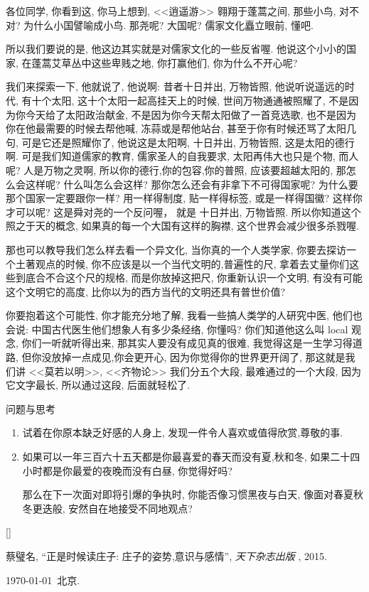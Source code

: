 \documentclass[11pt]{article}
\def\beginrefs{\begin{list}%
		{[\arabic{equation}]}{\usecounter{equation}
			\setlength{\leftmargin}{0.8truecm}\setlength{\labelsep}{0.4truecm}%
			\setlength{\labelwidth}{1.6truecm}}}
\def\endrefs{\end{list}}
\def\bibentry#1{\item[\hbox{[#1]}]}
\begin{document}
各位同学, 你看到这, 你马上想到, <<逍遥游>> 翱翔于蓬蒿之间, 那些小鸟, 对不对? 为什么小国譬喻成小鸟. 那尧呢? 大国呢? 儒家文化矗立眼前, 懂吧. 

所以我们要说的是, 他这边其实就是对儒家文化的一些反省喔. 他说这个小小的国家, 在蓬蒿艾草丛中这些卑贱之地, 你打赢他们, 你为什么不开心呢? 

我们来探索一下, 他就说了, 他说啊: {\color{blue} 昔者十日并出, 万物皆照}, 他说听说遥远的时代, 有十个太阳, 这十个太阳一起高挂天上的时候, 世间万物通通被照耀了, 不是因为你今天给了太阳政治献金, 不是因为你今天帮太阳做了一首竞选歌, 也不是因为你在他最需要的时候去帮他喊, 冻蒜或是帮他站台, 甚至于你有时候还骂了太阳几句, 可是它还是照耀你了, 他说这是太阳啊, {\color{blue} 十日并出, 万物皆照}, 这是太阳的德行啊. 可是我们知道儒家的教育, 儒家圣人的自我要求, 太阳再伟大也只是个物, 而人呢? 人是万物之灵啊, 所以你的德行,你的包容,你的普照, 应该要超越太阳的, 那怎么会这样呢? 什么叫怎么会这样? 那你怎么还会有非拿下不可得国家呢? 为什么要那个国家一定要跟你一样? 用一样得制度, 贴一样得标签, 或是一样得国徽? 这样你才可以呢? 这是舜对尧的一个反问喔， 就是 {\color{blue} 十日并出, 万物皆照}. 所以你知道这个照之于天的概念, 如果真的每一个大国有这样的胸襟, 这个世界会减少很多杀戮喔. 

那也可以教导我们怎么样去看一个异文化, 当你真的一个人类学家, 你要去探访一个土著观点的时候, 你不应该是以一个当代文明的,普遍性的尺, 拿着去丈量你们这些到底合不合这个尺的规格, 而是你放掉这把尺, 你重新认识一个文明, 有没有可能这个文明它的高度, 比你以为的西方当代的文明还具有普世价值? 

你要抱着这个可能性, 你才能充分地了解, 我看一些搞人类学的人研究中医, 他们也会说: 中国古代医生他们想象人有多少条经络, 你懂吗? 你们知道他这么叫 local 观念, 你们一听就听得出来, 那其实人要没有成见真的很难, 我觉得这是一生学习得道路, 但你没放掉一点成见,你会更开心, 因为你觉得你的世界更开阔了, 那这就是我们讲 <<莫若以明>>, <<齐物论>> 我们分五个大段, 最难通过的一个大段, 因为它文字最长, 所以通过这段, 后面就轻松了. 

{\Large {\color{purple} 问题与思考}}
\vspace{-0.5cm}
\begin{enumerate}
	\item 试着在你原本缺乏好感的人身上, 发现一件令人喜欢或值得欣赏,尊敬的事.
	\item 如果可以一年三百六十五天都是你最喜爱的春天而没有夏,秋和冬, 如果二十四小时都是你最爱的夜晚而没有白昼, 你觉得好吗? 
	
	那么在下一次面对即将引爆的争执时, 你能否像习惯黑夜与白天, 像面对春夏秋冬更迭般, 安然自在地接受不同地观点? 
\end{enumerate}
%

	 



\beginrefs
\bibentry{1}{ 蔡璧名}, 
``正是时候读庄子: 庄子的姿势,意识与感情'',
{\it 天下杂志出版 },
2015.
\endrefs

\begin{flushright}
	\tiny \kaishu \today  \  北京.
\end{flushright}
\end{document}
